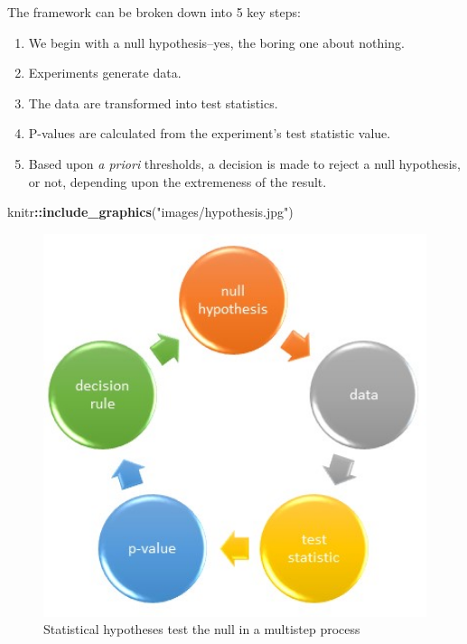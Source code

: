 \documentclass[]{book}
\newenvironment{Shaded}{\begin{snugshade}}{\end{snugshade}}
\newcommand{\KeywordTok}[1]{\textcolor[rgb]{0.13,0.29,0.53}{\textbf{#1}}}
\newcommand{\NormalTok}[1]{#1}
\newcommand{\OperatorTok}[1]{\textcolor[rgb]{0.81,0.36,0.00}{\textbf{#1}}}
\newcommand{\StringTok}[1]{\textcolor[rgb]{0.31,0.60,0.02}{#1}}
\providecommand{\tightlist}{%
  \setlength{\itemsep}{0pt}\setlength{\parskip}{0pt}}
\begin{document}
The framework can be broken down into 5 key steps:

\begin{enumerate}
\def\labelenumi{\roman{enumi}.}
\tightlist
\item
  We begin with a null hypothesis--yes, the boring one about nothing.
\item
  Experiments generate data.
\item
  The data are transformed into test statistics.
\item
  P-values are calculated from the experiment's test statistic value.
\item
  Based upon \emph{a priori} thresholds, a decision is made to reject a null hypothesis, or not, depending upon the extremeness of the result.
\end{enumerate}

\begin{Shaded}
\begin{Highlighting}[]
\NormalTok{knitr}\OperatorTok{::}\KeywordTok{include_graphics}\NormalTok{(}\StringTok{"images/hypothesis.jpg"}\NormalTok{)}
\end{Highlighting}
\end{Shaded}

\begin{figure}
\includegraphics[width=5.33in]{images/hypothesis} \caption{Statistical hypotheses test the null in a multistep process}\label{fig:unnamed-chunk-12}
\end{figure}
\end{document}

